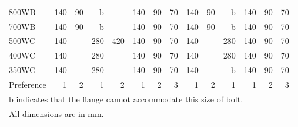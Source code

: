 \begin{table}[H]
\begin{minipage}{.8\linewidth}
\begin{tabular}{l|rr|rr|rrr|rr|r|rrr}
	800WB                       & 140 &                       90 &   b &                          & 140 & 90 &                 70 & 140 &                       90 &                              b & 140 & 90 &                70 \\
	700WB                       & 140 &                       90 &   b &                          & 140 & 90 &                 70 & 140 &                       90 &                              b & 140 & 90 &                70 \\ \midrule
	500WC                       & 140 &                          & 280 &                      420 & 140 & 90 &                 70 & 140 &                          &                            280 & 140 & 90 &                70 \\
	400WC                       & 140 &                          & 280 &                          & 140 & 90 &                 70 & 140 &                          &                            280 & 140 & 90 &                70 \\
	350WC                       & 140 &                          & 280 &                          & 140 & 90 &                 70 & 140 &                          &                              b & 140 & 90 &                70 \\
	Preference                  &   1 &                        2 &   1 &                        2 &   1 &  2 &                  3 &   1 &                        2 &                              1 &   1 &  2 &                 3 \\ \bottomrule
	\multicolumn{14}{l}{b indicates that the flange cannot accommodate this size of bolt.}                                                                                                                                         \\
	\multicolumn{14}{l}{All dimensions are in \si{\mm}.}
\end{tabular}
\end{minipage}
\begin{minipage}{.19\linewidth}\centering

\end{minipage}
\end{table}
